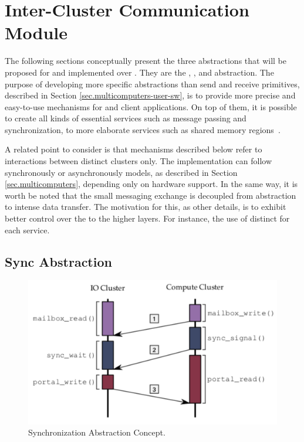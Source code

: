 \section{Inter-Cluster Communication Module}
\label{sec.inter-cluster-communication}

	The following sections conceptually present the three abstractions
	that will be proposed for \hal and implemented over \mppa.
	They are the \sync, \mailbox, and \portal abstraction.
	The purpose of developing more specific abstractions than
	send and receive primitives, described in Section \ref{sec.multicomputers-user-sw},
	is to provide more precise and easy-to-use mechanisms for
	\os and client applications.
	On top of them, it is possible to create all kinds of essential
	services such as message passing and synchronization,
	to more elaborate services such as shared memory regions~\cite{penna:rmen}.

	A related point to consider is that mechanisms described below refer
	to interactions between distinct clusters only.
	The implementation can follow synchronously or asynchronously models,
	as described in Section \ref{sec.multicomputers}, depending only on hardware support.
	In the same way, it is worth be noted that the small messaging exchange
	is decoupled from abstraction to intense data transfer.
	The motivation for this, as other details, is to exhibit better control
	over the \qos to the higher layers.
	For instance, the use of distinct \nocs for each service.

		\subsection{Sync Abstraction}
		\label{sec.sync-abs}

			\begin{figure}[h]
				\centering
				\includegraphics[width=.7\textwidth]{images/conceptual-sync.png}

				\caption{
					Synchronization Abstraction Concept.
				}\par
				\label{fig.conpt_sync}
			\end{figure}

